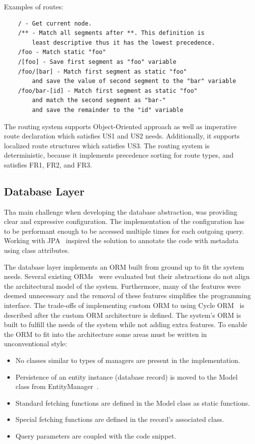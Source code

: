 Examples of routes:

\begin{verbatim}
    / - Get current node.
    /** - Match all segments after **. This definition is
        least descriptive thus it has the lowest precedence.
    /foo - Match static "foo"
    /[foo] - Save first segment as "foo" variable
    /foo/[bar] - Match first segment as static "foo"
        and save the value of second segment to the "bar" variable
    /foo/bar-[id] - Match first segment as static "foo"
        and match the second segment as "bar-"
        and save the remainder to the "id" variable
\end{verbatim}

The routing system supports Object-Oriented approach as well as imperative route declaration which satisfies US1 and US2 needs.
Additionally, it supports localized route structures which satisfies US3.
The routing system is deterministic, because it implements precedence sorting for route types, and satisfies FR1, FR2, and FR3.



\subsection{Database Layer}\label{subsec:databaseLayer}
Tha main challenge when developing the database abstraction, was providing clear and expressive configuration.
The implementation of the configuration has to be performant enough to be accessed multiple times for each outgoing query.
Working with JPA~\parencite{oracle_javaee6_tutorial} inspired the solution to annotate the code with metadata using class attributes.

The database layer implements an ORM built from ground up to fit the system needs.
Several existing ORMs~\parencite{cycle_orm,doctrine_orm} were evaluated but their abstractions
do not align the architectural model of the system.
Furthermore, many of the features were deemed unnecessary and the removal of these features simplifies the programming interface.
The trade-offs of implementing custom ORM to using Cycle ORM~\parencite{cycle_orm} is described after the custom ORM architecture is defined.
The system's ORM is built to fulfill the needs of the system while not adding extra features.
To enable the ORM to fit into the architecture some areas must be written in unconventional style:

\begin{itemize}
    \item No classes similar to types of managers are present in the implementation.
    \item Persistence of an entity instance (database record) is moved to the Model class from EntityManager~\parencite{cycle_orm_crd}.
    \item Standard fetching functions are defined in the Model class as static functions.
    \item Special fetching functions are defined in the record's associated class.
    \item Query parameters are coupled with the code snippet.
\end{itemize}

